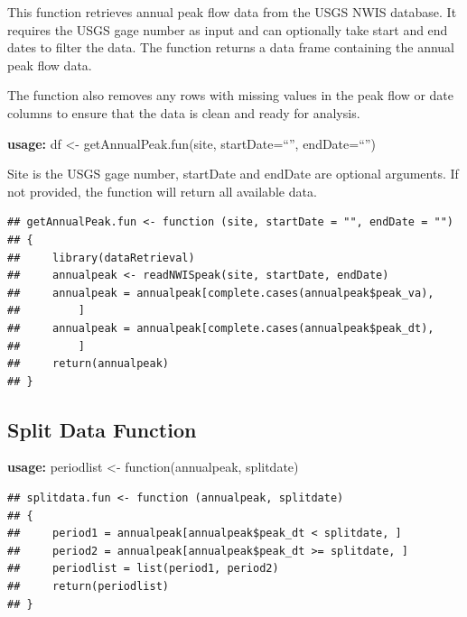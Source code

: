 \documentclass{tufte-handout}\usepackage[]{graphicx}\usepackage[]{xcolor}
\makeatletter
\newenvironment{kframe}{%
 \def\at@end@of@kframe{}%
 \ifinner\ifhmode%
  \def\at@end@of@kframe{\end{minipage}}%
  \begin{minipage}{\columnwidth}%
 \fi\fi%
 \def\FrameCommand##1{\hskip\@totalleftmargin \hskip-\fboxsep
 \colorbox{shadecolor}{##1}\hskip-\fboxsep
     \hskip-\linewidth \hskip-\@totalleftmargin \hskip\columnwidth}%
 \MakeFramed {\advance\hsize-\width
   \@totalleftmargin\z@ \linewidth\hsize
   \@setminipage}}%
 {\par\unskip\endMakeFramed%
 \at@end@of@kframe}
\newenvironment{knitrout}{}{} %
\makeatother
\begin{document}
This function retrieves annual peak flow data from the USGS NWIS database. It requires the USGS gage number as input and can optionally take start and end dates to filter the data. The function returns a data frame containing the annual peak flow data.

The function also removes any rows with missing values in the peak flow or date columns to ensure that the data is clean and ready for analysis.

\textbf{usage:} df <- getAnnualPeak.fun(site, startDate=``'', endDate=``'')

Site is the USGS gage number, startDate and endDate are optional arguments. If not provided, the function will return all available data.

\begin{knitrout}
\color{fgcolor}\begin{kframe}
\begin{verbatim}
## getAnnualPeak.fun <- function (site, startDate = "", endDate = "") 
## {
##     library(dataRetrieval)
##     annualpeak <- readNWISpeak(site, startDate, endDate)
##     annualpeak = annualpeak[complete.cases(annualpeak$peak_va), 
##         ]
##     annualpeak = annualpeak[complete.cases(annualpeak$peak_dt), 
##         ]
##     return(annualpeak)
## }
\end{verbatim}
\end{kframe}
\end{knitrout}




\subsection{Split Data Function}


\textbf{usage:} periodlist <- function(annualpeak, splitdate)

\begin{knitrout}
\color{fgcolor}\begin{kframe}
\begin{verbatim}
## splitdata.fun <- function (annualpeak, splitdate) 
## {
##     period1 = annualpeak[annualpeak$peak_dt < splitdate, ]
##     period2 = annualpeak[annualpeak$peak_dt >= splitdate, ]
##     periodlist = list(period1, period2)
##     return(periodlist)
## }
\end{verbatim}
\end{kframe}
\end{knitrout}
\end{document}
